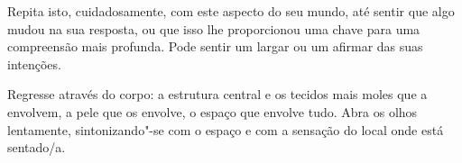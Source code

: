 Repita isto, cuidadosamente, com este aspecto do seu mundo, até sentir que algo mudou na sua resposta, ou que isso lhe proporcionou uma chave para uma compreensão mais profunda. Pode sentir um largar ou um afirmar das suas intenções.

Regresse através do corpo: a estrutura central e os tecidos mais moles que a envolvem, a pele que os envolve, o espaço que envolve tudo. Abra os olhos lentamente, sintonizando"-se com o espaço e com a sensação do local onde está sentado/a.
